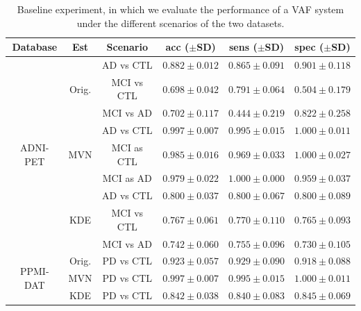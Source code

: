 \begin{table}[htp]
	\renewcommand{\arraystretch}{1.3}
	\centering
	\begin{tabular}{cccccc}
		\toprule
		Database  & Est & Scenario & acc ($\pm$SD) & sens ($\pm$SD) & spec ($\pm$SD)\\
		\midrule
		\multirow{9}{*}{ADNI-PET} & \multirow{3}{*}{Orig.} & \ac{AD} vs \ac{CTL} & $0.882 \pm 0.012 $ & $0.865 \pm 0.091$ & $0.901 \pm 0.118$\\
		& & \ac{MCI} vs \ac{CTL} & $0.698 \pm 0.042 $ & $0.791 \pm 0.064$ & $0.504 \pm 0.179$\\
		& & \ac{MCI} vs \ac{AD} & $0.702 \pm 0.117 $ & $0.444 \pm 0.219$ & $0.822 \pm 0.258$\\
		\cline{2-6}
		& \multirow{3}{*}{\ac{MVN}} & \ac{AD} vs \ac{CTL} & $ 0.997 \pm 0.007 $ & $0.995 \pm 0.015 $ & $1.000 \pm 0.011 $\\
		& & \ac{MCI} as \ac{CTL} & $0.985 \pm 0.016 $ & $0.969 \pm 0.033 $ & $1.000 \pm 0.027 $\\
		& & \ac{MCI} as \ac{AD} & $0.979 \pm 0.022 $ & $1.000 \pm 0.000 $ & $0.959 \pm 0.037 $\\
		\cline{2-6}
		& \multirow{3}{*}{\ac{KDE}} & \ac{AD} vs \ac{CTL} & $0.800 \pm 0.037 $ & $0.800 \pm 0.067 $ & $0.800 \pm 0.089 $\\
		& & \ac{MCI} vs \ac{CTL} & $0.767 \pm 0.061 $ & $0.770 \pm 0.110 $ & $0.765 \pm 0.093 $\\
		& & \ac{MCI} vs \ac{AD} & $0.742 \pm 0.060 $ & $0.755 \pm 0.096 $ & $0.730 \pm 0.105 $\\
		\midrule
		\multirow{3}{*}{PPMI-DAT} & Orig. & \ac{PD} vs \ac{CTL}  & $0.923 \pm 0.057 $ & $0.929 \pm 0.090 $ & $0.918 \pm 0.088 $\\
		\cline{2-6}
		& \ac{MVN} & \ac{PD} vs \ac{CTL}  & $0.997 \pm 0.007 $ & $0.995 \pm 0.015 $ & $1.000 \pm 0.011 $\\
		\cline{2-6}
		& \ac{KDE} & \ac{PD} vs \ac{CTL}  & $0.842 \pm 0.038 $ & $0.840 \pm 0.083 $ & $0.845 \pm 0.069 $\\
		\bottomrule
	\end{tabular}
	\vspace{1em}
	\caption{Baseline experiment, in which we evaluate the performance of a VAF system under the different scenarios of the two datasets.}
	\label{tab:baselineSyn}
\end{table}

